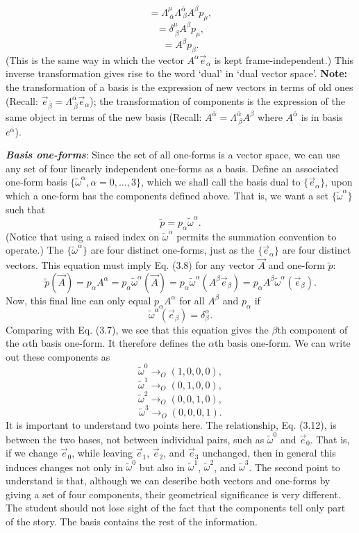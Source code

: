\documentclass[12pt]{book}
\begin{document}
    \[
    = \Lambda^\mu_{\ \bar{\alpha}} \Lambda^{\bar{\alpha}}_{\ \beta} A^\beta p_\mu, \tag{3.10b}
    \]
    \[
    = \delta^\mu_{\ \beta} A^\beta p_\mu, \tag{3.10c}
    \]
    \[
    = A^\beta p_\beta. \tag{3.10d}
    \]
    (This is the same way in which the vector \(A^\alpha \vec{e}_\alpha\) is kept frame-independent.) This inverse transformation gives rise to the word ‘dual’ in ‘dual vector space’. \textbf{Note:} the transformation of a basis is the expression of new vectors in terms of old ones (Recall: \(\vec{e}_{\bar{\beta}} = \Lambda^\alpha_{\ \bar{\beta}} \vec{e}_\alpha\)); the transformation of components is the expression of the same object in terms of the new basis (Recall: \(A^\bar{\alpha}=\Lambda^{\bar{\alpha}}_{\ \beta} A^\beta\) where $A^\bar{\alpha}$ is in basis $e^\bar{\alpha}$).

    \textit{\textbf{Basis one-forms}}: Since the set of all one-forms is a vector space, we can use any set of four linearly independent one-forms as a basis. Define an associated one-form basis \(\{ \tilde{\omega}^\alpha, \alpha = 0, \dots, 3 \}\), which we shall call the basis dual to \(\{\vec{e}_\alpha\}\), upon which a one-form has the components defined above. That is, we want a set \(\{\tilde{\omega}^\alpha\}\) such that    \[
    \tilde{p} = p_\alpha \tilde{\omega}^\alpha. \tag{3.11}
    \]
    (Notice that using a raised index on \(\tilde{\omega}^\alpha\) permits the summation convention to operate.) The \(\{\tilde{\omega}^\alpha\}\) are four distinct one-forms, just as the \(\{\vec{e}_\alpha\}\) are four distinct vectors. This equation must imply Eq. (3.8) for any vector \(\vec{A}\) and one-form \(\tilde{p}\):
    \[
    \tilde{p}(\vec{A}) = p_\alpha A^\alpha= p_\alpha \tilde{\omega}^\alpha(\vec{A})
    = p_\alpha \tilde{\omega}^\alpha(A^\beta \vec{e}_\beta)
    = p_\alpha A^\beta \tilde{\omega}^\alpha(\vec{e}_\beta).
    \]
    Now, this final line can only equal \(p_\alpha A^\alpha\) for all \(A^\beta\) and \(p_\alpha\) if
    \[
    \tilde{\omega}^\alpha(\vec{e}_\beta) = \delta^\alpha_\beta. \tag{3.12}
    \]
    Comparing with Eq. (3.7), we see that this equation gives the \(\beta\)th component of the \(\alpha\)th basis one-form. It therefore defines the \(\alpha\)th basis one-form. We can write out these components as
    \[
    \tilde{\omega}^0 \rightarrow_O (1, 0, 0, 0),
    \]
    \[
    \tilde{\omega}^1 \rightarrow_O (0, 1, 0, 0),
    \]
    \[
    \tilde{\omega}^2 \rightarrow_O (0, 0, 1, 0),
    \]
    \[
    \tilde{\omega}^3 \rightarrow_O (0, 0, 0, 1).
    \]
    It is important to understand two points here. The relationship, Eq. (3.12), is between the two bases, not between individual pairs, such as \(\tilde{\omega}^0\) and \(\vec{e}_0\). That is, if we change \(\vec{e}_0\), while leaving \(\vec{e}_1\), \(\vec{e}_2\), and \(\vec{e}_3\) unchanged, then in general this induces changes not only in \(\tilde{\omega}^0\) but also in \(\tilde{\omega}^1\), \(\tilde{\omega}^2\), and \(\tilde{\omega}^3\). The second point to understand is that, although we can describe both vectors and one-forms by giving a set of four components, their geometrical significance is very different. The student should not lose sight of the fact that the components tell only part of the story. The basis contains the rest of the information.
\end{document}
